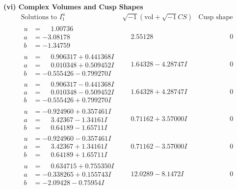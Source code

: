\documentclass[1p]{elsarticle_modified}
\theoremstyle{definition}
\newcommand{\I}{\sqrt{-1}}
\begin{document}
\newpage\flushleft \textbf{(vi) Complex Volumes and Cusp Shapes}
$$\begin{array}{c|c|c}  
\text{Solutions to }I^u_{1}& \I (\text{vol} + \sqrt{-1}CS) & \text{Cusp shape}\\
 \hline 
\begin{aligned}
u &= \phantom{-}1.00736\phantom{ +0.000000I} \\
a &= -3.08178\phantom{ +0.000000I} \\
b &= -1.34759\phantom{ +0.000000I}\end{aligned}
 & \phantom{-}2.55128\phantom{ +0.000000I} & \phantom{-0.000000 } 0 \\ \hline\begin{aligned}
u &= \phantom{-}0.906317 + 0.441368 I \\
a &= \phantom{-}0.010348 + 0.509452 I \\
b &= -0.555426 - 0.799270 I\end{aligned}
 & \phantom{-}1.64328 - 4.28747 I & \phantom{-0.000000 } 0 \\ \hline\begin{aligned}
u &= \phantom{-}0.906317 - 0.441368 I \\
a &= \phantom{-}0.010348 - 0.509452 I \\
b &= -0.555426 + 0.799270 I\end{aligned}
 & \phantom{-}1.64328 + 4.28747 I & \phantom{-0.000000 } 0 \\ \hline\begin{aligned}
u &= -0.924960 + 0.357461 I \\
a &= \phantom{-}3.42367 - 1.34161 I \\
b &= \phantom{-}0.64189 - 1.65711 I\end{aligned}
 & \phantom{-}0.71162 + 3.57000 I & \phantom{-0.000000 } 0 \\ \hline\begin{aligned}
u &= -0.924960 - 0.357461 I \\
a &= \phantom{-}3.42367 + 1.34161 I \\
b &= \phantom{-}0.64189 + 1.65711 I\end{aligned}
 & \phantom{-}0.71162 - 3.57000 I & \phantom{-0.000000 } 0 \\ \hline\begin{aligned}
u &= \phantom{-}0.634715 + 0.755350 I \\
a &= -0.338265 + 0.155743 I \\
b &= -2.09428 - 0.75954 I\end{aligned}
 & \phantom{-}12.0289 - 8.1472 I & \phantom{-0.000000 } 0 \\ \hline\begin{aligned}

\end{aligned}
\end{array}$$
\end{document}
